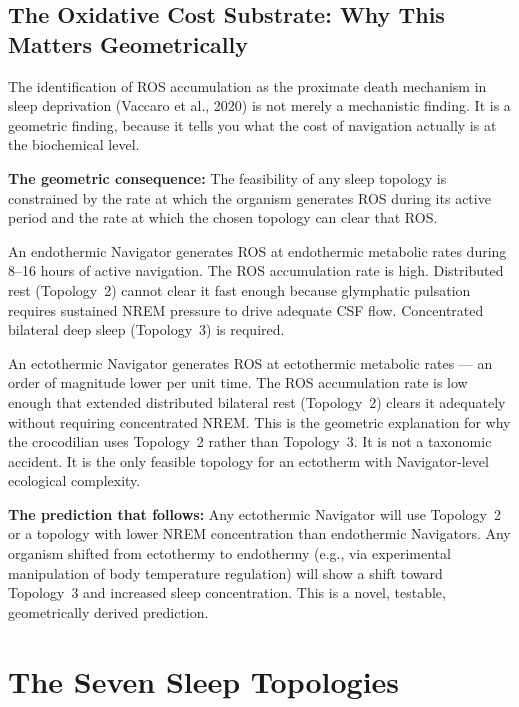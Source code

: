 \documentclass[10pt, a4paper]{article}
\begin{document}
\subsection{The Oxidative Cost Substrate:
Why This Matters Geometrically}

The identification of ROS accumulation
as the proximate death mechanism in
sleep deprivation (Vaccaro et al., 2020)
is not merely a mechanistic finding.
It is a geometric finding, because it
tells you what the cost of navigation
actually is at the biochemical level.

\textbf{The geometric consequence:}
The feasibility of any sleep topology is
constrained by the rate at which the
organism generates ROS during its active
period and the rate at which the chosen
topology can clear that ROS.

An endothermic Navigator generates ROS
at endothermic metabolic rates during
8--16 hours of active navigation.
The ROS accumulation rate is high.
Distributed rest (Topology~2) cannot
clear it fast enough because glymphatic
pulsation requires sustained NREM
pressure to drive adequate CSF flow.
Concentrated bilateral deep sleep
(Topology~3) is required.

An ectothermic Navigator generates ROS
at ectothermic metabolic rates --- an
order of magnitude lower per unit time.
The ROS accumulation rate is low enough
that extended distributed bilateral rest
(Topology~2) clears it adequately without
requiring concentrated NREM. This is
the geometric explanation for why the
crocodilian uses Topology~2 rather than
Topology~3. It is not a taxonomic
accident. It is the only feasible topology
for an ectotherm with Navigator-level
ecological complexity.

\textbf{The prediction that follows:}
Any ectothermic Navigator will use
Topology~2 or a topology with lower
NREM concentration than endothermic
Navigators. Any organism shifted from
ectothermy to endothermy (e.g., via
experimental manipulation of body
temperature regulation) will show a
shift toward Topology~3 and increased
sleep concentration. This is a novel,
testable, geometrically derived prediction.

\section{The Seven Sleep Topologies}
\label{sec:topologies}
\end{document}
